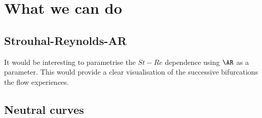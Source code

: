 \documentclass[onecolumn,notitlepage,superscriptaddress, amsmath,amssymb,longbibliographyaps,floatfix]{revtex4-1}
\begin{document}

\section{What we can do}

\subsection{Strouhal-Reynolds-AR}

It would be interesting to parametrise the $St-Re$ dependence using $\AR$ as a parameter. This would provide a clear visualisation of the successive bifurcations the flow experiences.

\subsection{Neutral curves}
\end{document}
